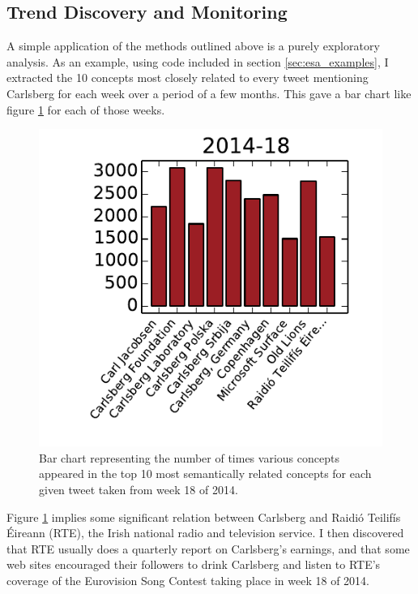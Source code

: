 \subsection{Trend Discovery and Monitoring}
\label{sec:esa_monitoring}
A simple application of the methods outlined above is a purely exploratory analysis. As an example, using code included in section \ref{sec:esa_examples}, I extracted the 10 concepts most closely related to every tweet mentioning Carlsberg for each week over a period of a few months. This gave a bar chart like figure \ref{fig:carlsberg_exploratory_chart} for each of those weeks.
\begin{figure} %
	\centering
	\includegraphics[width=\figwidth]{pics/esa/irish_radio_bar_chart.pdf}
	\caption{Bar chart representing the number of times various concepts appeared in the top 10 most semantically related concepts for each given tweet taken from week 18 of 2014.}
	\label{fig:carlsberg_exploratory_chart}
\end{figure}
Figure \ref{fig:carlsberg_exploratory_chart} implies some significant relation between Carlsberg and Raidió Teilifís Éireann (RTE), the Irish national radio and television service. I then discovered that RTE usually does a quarterly report on Carlsberg's earnings, and that some web sites encouraged their followers to drink Carlsberg and listen to RTE's coverage of the Eurovision Song Contest taking place in week 18 of 2014.

